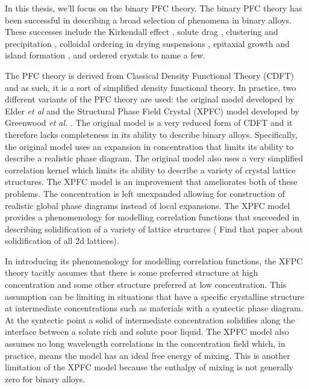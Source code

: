 
In this thesis, we'll focus on the binary PFC theory. The binary PFC theory has
been successful in describing a broad selection of phenomena in binary alloys.
These successes include the Kirkendall effect \cite{ELDER11_KIRKENDALL, LU15},
solute drag \cite{GREENWOOD12}, clustering and precipitation \cite{FALLAH12,
FALLAH13, FALLAH13_AlCu_experiment}, colloidal ordering in drying suspensions
\cite{GANAI13}, epitaxial growth and island formation \cite{ELDER10_NANOISLAND,
LU16}, and ordered crystals \cite{ALSTER17} to name a few. 

The PFC theory is derived from Classical Density Functional Theory (CDFT) and as
such, it is a sort of simplified density functional theory. In practice, two
different variants of the PFC theory are used: the original model developed by
Elder \textit{et al} \cite{ELDER07} and the Structural Phase Field Crystal
(XPFC) model developed by Greenwood \textit{et al.} \cite{GREENWOOD11_BINARY}.
The original model is a very reduced form of CDFT and it therefore lacks
completeness in its ability to describe binary alloys. Specifically, the
original model uses an expansion in concentration that limits its ability to
describe a realistic phase diagram. The original model also uses a very
simplified correlation kernel which limits its ability to describe a variety of
crystal lattice structures. The XPFC model is an improvement that ameliorates
both of these problems. The concentration is left unexpanded allowing for
construction of realistic global phase diagrams instead of local expansions. The
XPFC model provides a phenomenology for modelling correlation functions that
succeeded in describing solidification of a variety of lattice structures
({\color{ForestGreen} Find that paper about solidification of all 2d lattices}).



In introducing its phenomenology for modelling correlation functions, the XFPC
theory tacitly assumes that there is some preferred structure at high
concentration and some other structure preferred at low concentration. This
assumption can be limiting in situations that have a specific crystalline
structure at intermediate concentrations such as materials with a syntectic
phase diagram. At the syntectic point a solid of intermediate concentration
solidifies along the interface between a solute rich and solute poor liquid. The
XPFC model also assumes no long wavelength correlations in the concentration
field which, in practice, means the model has an ideal free energy of mixing.
This is another limitation of the XPFC model because the enthalpy of mixing is
not generally zero for binary alloys.

